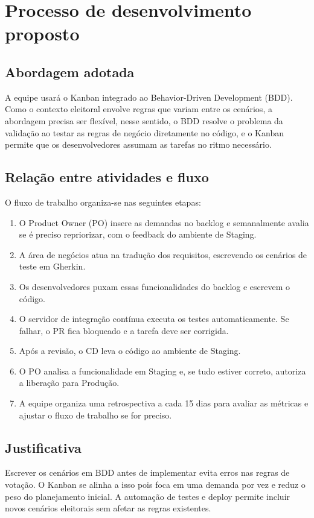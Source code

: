 \documentclass[12pt,a4paper]{article}
\begin{document}
\section{Processo de desenvolvimento proposto}

\subsection{Abordagem adotada}
A equipe usará o Kanban integrado ao Behavior-Driven Development (BDD). Como o contexto eleitoral envolve regras que variam entre os cenários, a abordagem precisa ser flexível, nesse sentido, o BDD resolve o problema da validação ao testar as regras de negócio diretamente no código, e o Kanban permite que os desenvolvedores assumam as tarefas no ritmo necessário.

\subsection{Relação entre atividades e fluxo}
O fluxo de trabalho organiza-se nas seguintes etapas:
\begin{enumerate}
    \item O Product Owner (PO) insere as demandas no backlog e semanalmente avalia se é preciso repriorizar, com o feedback do ambiente de Staging.
    \item A área de negócios atua na tradução dos requisitos, escrevendo os cenários de teste em Gherkin.
    \item Os desenvolvedores puxam essas funcionalidades do backlog e escrevem o código.
    \item O servidor de integração contínua executa os testes automaticamente. Se falhar, o PR fica bloqueado e a tarefa deve ser corrigida.
    \item Após a revisão, o CD leva o código ao ambiente de Staging.
    \item O PO analisa a funcionalidade em Staging e, se tudo estiver correto, autoriza a liberação para Produção.
    \item A equipe organiza uma retrospectiva a cada 15 dias para avaliar as métricas e ajustar o fluxo de trabalho se for preciso.
\end{enumerate}

\subsection{Justificativa}
Escrever os cenários em BDD antes de implementar evita erros nas regras de votação. O Kanban se alinha a isso pois foca em uma demanda por vez e reduz o peso do planejamento inicial. A automação de testes e deploy permite incluir novos cenários eleitorais sem afetar as regras existentes.
\end{document}
